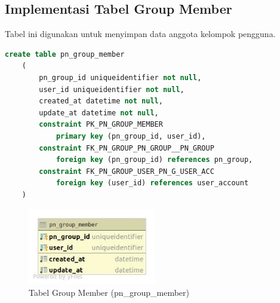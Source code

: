 \subsection{Implementasi Tabel Group Member}
\par Tabel ini digunakan untuk menyimpan data anggota kelompok pengguna.
\begin{lstlisting}[language=sql, firstnumber=1, caption=Implementasi Tabel Group Member]
    create table pn_group_member
    (
        pn_group_id uniqueidentifier not null,
        user_id uniqueidentifier not null,
        created_at datetime not null,
        update_at datetime not null,
        constraint PK_PN_GROUP_MEMBER
            primary key (pn_group_id, user_id),
        constraint FK_PN_GROUP_PN_GROUP__PN_GROUP
            foreign key (pn_group_id) references pn_group,
        constraint FK_PN_GROUP_USER_PN_G_USER_ACC
            foreign key (user_id) references user_account
    )
\end{lstlisting}
\begin{figure}[H]
    \centering\includegraphics[width=0.5\textwidth]{bab4/figures/tabel_pn_group_member.jpg}
    \caption{Tabel Group Member (pn\_group\_member)}
    \label{tabel_pn_group_member}
\end{figure}

